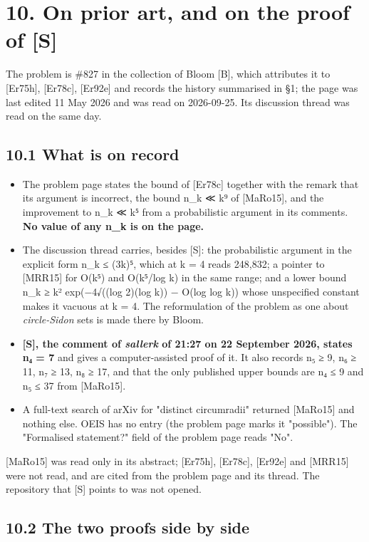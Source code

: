 \documentclass[11pt,a4paper]{article}
\theoremstyle{named}
\begin{document}
\section*{10. On prior art, and on the proof of [S]}

The problem is \#827 in the collection of Bloom [B], which attributes it to [Er75h], [Er78c], [Er92e] and records the history summarised in §1; the page was last edited 11 May 2026 and was read on 2026-09-25. Its discussion thread was read on the same day.

\subsection*{10.1 What is on record}

\begin{itemize}[leftmargin=1.4em,itemsep=.2em,topsep=.3em]
\item The problem page states the bound of [Er78c] together with the remark that its argument is incorrect, the bound n\_k ≪ k⁹ of [MaRo15], and the improvement to n\_k ≪ k⁵ from a probabilistic argument in its comments. \textbf{No value of any n\_k is on the page.}
\item The discussion thread carries, besides [S]: the probabilistic argument in the explicit form n\_k ≤ (3k)⁵, which at k = 4 reads 248,832; a pointer to [MRR15] for O(k⁵) and O(k⁵/log k) in the same range; and a lower bound n\_k ≥ k² exp(−4√((log 2)(log k)) − O(log log k)) whose unspecified constant makes it vacuous at k = 4. The reformulation of the problem as one about \textit{circle-Sidon} sets is made there by Bloom.
\item \textbf{[S], the comment of \textit{sallerk} of 21:27 on 22 September 2026, states n₄ = 7} and gives a computer-assisted proof of it. It also records n₅ ≥ 9, n₆ ≥ 11, n₇ ≥ 13, n₈ ≥ 17, and that the only published upper bounds are n₄ ≤ 9 and n₅ ≤ 37 from [MaRo15].
\item A full-text search of arXiv for "distinct circumradii" returned [MaRo15] and nothing else. OEIS has no entry (the problem page marks it "possible"). The "Formalised statement?" field of the problem page reads "No".
\end{itemize}

[MaRo15] was read only in its abstract; [Er75h], [Er78c], [Er92e] and [MRR15] were not read, and are cited from the problem page and its thread. The repository that [S] points to was not opened.

\subsection*{10.2 The two proofs side by side}
\end{document}
